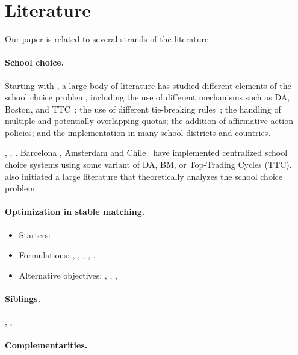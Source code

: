 \section{Literature}\label{sec: literature}

Our paper is related to several strands of the literature.

\paragraph{School choice.} Starting with \cite{Abdulkadiroglu2003}, a large body of literature has studied different elements of the school choice problem, including the use of different mechanisms such as DA, Boston, and TTC~\citep{abdulkadirouglu2005boston}; the use of different tie-breaking rules~\citep{Arnosti_2015,Ashlagi_2019}; the handling of multiple and potentially overlapping quotas; the addition of affirmative action policies; and the implementation in many school districts and countries.

 \cite{Abdulkadiroglu2003}, \citep{abdulkadirouglu2005new}, \citep{abdulkadirouglu2005boston}.  Barcelona \citep{calsamiglia2014illusion}, Amsterdam \citep{gautier2016eerste} and Chile~\cite{Correa_2022} have implemented centralized school choice systems using some variant of DA, BM, or Top-Trading Cycles (TTC). \cite{Abdulkadiroglu2003} also initiated a large literature that theoretically analyzes the school choice problem.

\paragraph{Optimization in stable matching.}
\begin{itemize}
  \item Starters: \cite{gusfield1989stable, vate1989linear,rothblum1992characterization,roth1993stable}
  \item Formulations: \cite{baiou2000stable}, \cite{kwanashie2014integer}, \cite{agoston2016integer}, \cite{agoston_etal2021}, \cite{delorme2019mathematical}.
  \item Alternative objectives: \cite{shi2016}, \cite{Ashlagi_2016}, \cite{bodon2020}, \cite{bobbio22}
\end{itemize}


\paragraph{Siblings.} \cite{Dur_2022}, \cite{Dur_2019}, \cite{Correa_2022}

\paragraph{Complementarities.}
